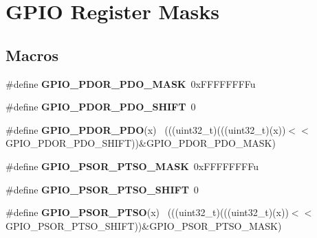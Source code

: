 \hypertarget{group___g_p_i_o___register___masks}{}\section{G\+P\+I\+O Register Masks}
\label{group___g_p_i_o___register___masks}
\subsection*{Macros}
\begin{DoxyCompactItemize}
\item 
\hypertarget{group___g_p_i_o___register___masks_gafd2a8274691295293b3cabfe86089801}{}\#define {\bfseries G\+P\+I\+O\+\_\+\+P\+D\+O\+R\+\_\+\+P\+D\+O\+\_\+\+M\+A\+S\+K}~0x\+F\+F\+F\+F\+F\+F\+F\+Fu\label{group___g_p_i_o___register___masks_gafd2a8274691295293b3cabfe86089801}

\item 
\hypertarget{group___g_p_i_o___register___masks_ga495b5f1e63de863534ce0c5f25f137ab}{}\#define {\bfseries G\+P\+I\+O\+\_\+\+P\+D\+O\+R\+\_\+\+P\+D\+O\+\_\+\+S\+H\+I\+F\+T}~0\label{group___g_p_i_o___register___masks_ga495b5f1e63de863534ce0c5f25f137ab}

\item 
\hypertarget{group___g_p_i_o___register___masks_ga79d6ac6995e51c108cc38b287e688f0d}{}\#define {\bfseries G\+P\+I\+O\+\_\+\+P\+D\+O\+R\+\_\+\+P\+D\+O}(x)                                              ~(((uint32\+\_\+t)(((uint32\+\_\+t)(x))$<$$<$G\+P\+I\+O\+\_\+\+P\+D\+O\+R\+\_\+\+P\+D\+O\+\_\+\+S\+H\+I\+F\+T))\&G\+P\+I\+O\+\_\+\+P\+D\+O\+R\+\_\+\+P\+D\+O\+\_\+\+M\+A\+S\+K)\label{group___g_p_i_o___register___masks_ga79d6ac6995e51c108cc38b287e688f0d}

\item 
\hypertarget{group___g_p_i_o___register___masks_gaa8a48e38ef70ff1ba3bbcbf31b891da4}{}\#define {\bfseries G\+P\+I\+O\+\_\+\+P\+S\+O\+R\+\_\+\+P\+T\+S\+O\+\_\+\+M\+A\+S\+K}~0x\+F\+F\+F\+F\+F\+F\+F\+Fu\label{group___g_p_i_o___register___masks_gaa8a48e38ef70ff1ba3bbcbf31b891da4}

\item 
\hypertarget{group___g_p_i_o___register___masks_ga5a962b85e07477e26afe639c7ca478cb}{}\#define {\bfseries G\+P\+I\+O\+\_\+\+P\+S\+O\+R\+\_\+\+P\+T\+S\+O\+\_\+\+S\+H\+I\+F\+T}~0\label{group___g_p_i_o___register___masks_ga5a962b85e07477e26afe639c7ca478cb}

\item 
\hypertarget{group___g_p_i_o___register___masks_gafea75a81df86bdc27b57b045f71a7866}{}\#define {\bfseries G\+P\+I\+O\+\_\+\+P\+S\+O\+R\+\_\+\+P\+T\+S\+O}(x)                                            ~(((uint32\+\_\+t)(((uint32\+\_\+t)(x))$<$$<$G\+P\+I\+O\+\_\+\+P\+S\+O\+R\+\_\+\+P\+T\+S\+O\+\_\+\+S\+H\+I\+F\+T))\&G\+P\+I\+O\+\_\+\+P\+S\+O\+R\+\_\+\+P\+T\+S\+O\+\_\+\+M\+A\+S\+K)\label{group___g_p_i_o___register___masks_gafea75a81df86bdc27b57b045f71a7866}


\end{DoxyCompactItemize}
